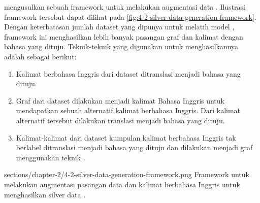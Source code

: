 \textcite{lee2022} mengusulkan sebuah framework untuk melakukan augmentasi data \AMR{}.
Ilustrasi framework tersebut dapat dilihat pada \cref{fig:4-2-silver-data-generation-framework}.
Dengan keterbatasan jumlah dataset yang dipunya untuk melatih model \crosslingual{}, framework ini menghasilkan lebih banyak pasangan graf \AMR{} dan kalimat dengan bahasa yang dituju.
Teknik-teknik yang digunakan untuk menghasilkannya adalah sebagai berikut:
\begin{enumerate}
  \item Kalimat berbahasa Inggris dari dataset \AMR{} ditranslasi menjadi bahasa yang dituju.

  \item Graf \AMR{} dari dataset \AMR{} dilakukan  menjadi kalimat Bahasa Inggris untuk mendapatkan sebuah alternatif kalimat berbahasa Inggris.
  Dari kalimat alternatif tersebut dilakukan translasi menjadi bahasa yang dituju.

  \item Kalimat-kalimat dari dataset kumpulan kalimat berbahasa Inggris tak berlabel ditranslasi menjadi bahasa yang dituju dan dilakukan  menjadi graf \AMR{} menggunakan teknik .
\end{enumerate}

  {sections/chapter-2/4-2-silver-data-generation-framework.png}
  {Framework untuk melakukan augmentasi pasangan data \AMR{} dan kalimat berbahasa Inggris untuk menghasilkan silver data .}
